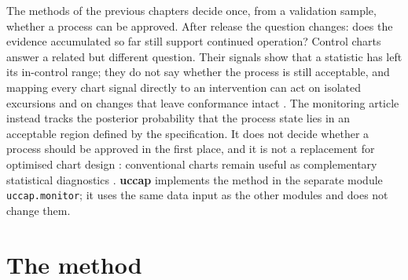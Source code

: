 \documentclass[a4paper,11pt,oneside,openany,parskip=half-,headings=standardclasses,toc=flat,numbers=noenddot]{scrbook}
\newcommand{\code}[1]{\texttt{\begingroup\def\_{\textunderscore\allowbreak}#1\endgroup}}
\newcommand{\pkg}{\textsf{\bfseries uccap}}
\begin{document}
The methods of the previous chapters decide once, from a validation sample, whether a process can be approved.
After release the question changes: does the evidence accumulated so far still support continued operation?
Control charts answer a related but different question. Their signals show that a statistic has left its
in-control range; they do not say whether the process is still acceptable, and mapping every chart signal directly
to an intervention can act on isolated excursions and on changes that leave conformance intact
\cite[Sec.~2.1]{jy-monitor}. The monitoring article instead tracks the posterior probability that the process
state lies in an acceptable region defined by the specification. It does not decide whether a process should be
approved in the first place, and it is not a replacement for optimised chart design \cite[Sec.~1]{jy-monitor}:
conventional charts remain useful as complementary statistical diagnostics \cite[Sec.~6]{jy-monitor}.
\pkg{} implements the method in the separate module \code{uccap.monitor}; it uses the same data input as the
other modules and does not change them.

\section{The method}\label{sec:sboam}
\end{document}
